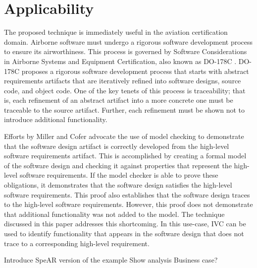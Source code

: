 \section{Applicability}
\label{sec:applicability}

The proposed technique is immediately useful in the aviation certification domain. Airborne software must undergo a rigorous software development process to ensure its airworthiness. This process is governed by Software Considerations in Airborne Systems and Equipment Certification, also known as DO-178C \cite{}. DO-178C proposes a rigorous software development process that starts with abstract requirements artifacts that are iteratively refined into software designs, source code, and object code. One of the key tenets of this process is traceability; that is, each refinement of an abstract artifact into a more concrete one must be traceable to the source artifact. Further, each refinement must be shown not to introduce additional functionality.

Efforts by Miller and Cofer \cite{} advocate the use of model checking to demonstrate that the software design artifact is correctly developed from the high-level software requirements artifact. This is accomplished by creating a formal model of the software design and checking it against properties that represent the high-level software requirements. If the model checker is able to prove these obligations, it demonstrates that the software design satisfies the high-level software requirements. This proof also establishes that the software design traces to the high-level software requirements. However, this proof does not demonstrate that additional functionality was not added to the model. The technique discussed in this paper addresses this shortcoming. In this use-case, IVC can be used to identify functionality that appears in the software design that does not trace to a corresponding high-level requirement.

Introduce SpeAR version of the example
Show analysis
Business case?
